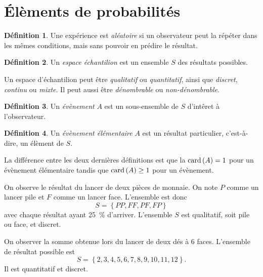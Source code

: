 \documentclass[11pt]{article}
\makeatletter
\newcommand\card{%
	\ensuremath{%
		\mathrm{card}\,%
	}%
}%
\theoremstyle{remark}
\theoremstyle{definition}
\newtheorem*{@definition}{Définition}
\newenvironment{definition}{%
	\begin{@definition}%
}{%
	\end{@definition}%
	\setcounter{property}{0}%
}
\makeatother
\begin{document}
\tableofcontents
\pagebreak

\section{Élèments de probabilités}
\begin{definition}
	Une expérience est \textit{aléatoire} si un observateur peut la répéter
	dans les mêmes conditions, mais sans pouvoir en prédire le résultat.
\end{definition}

\begin{definition}
	Un \textit{espace échantilion} est un ensemble $S$ des résultats possibles.
\end{definition}

Un espace d'échantilion peut être \textit{qualitatif} ou \textit{quantitatif},
ainsi que \textit{discret}, \textit{continu} ou \textit{mixte}. Il peut aussi
être \textit{dénombrable} ou \textit{non-dénombrable}.

\begin{definition}
	Un \textit{évènement} $A$ est un sous-ensemble de $S$ d'intêret à
	l'observateur.
\end{definition}

\begin{definition}
	Un \textit{évènement élémentaire} $A$ est un résultat particulier,
	c'est-à-dire, un élèment de $S$.
\end{definition}

La différence entre les deux dernières définitions est que la $\card(A)=1$ pour
un évènement élémentaire tandis que $\card(A)\geq 1$ pour un évènement.

\begin{exemple}
	On observe le résultat du lancer de deux pièces de monnaie. On note $P$
	comme un lancer pile et $F$ comme un lancer face. L'ensemble est donc
	\begin{equation*}
		S=\left\{PP, FF, PF, FP\right\}
	\end{equation*}
	avec chaque résultat ayant \SI{25}{\percent} d'arriver. L'ensemble $S$ est
	qualitatif, soit pile ou face, et discret.
\end{exemple}

\begin{exemple}
	On observer la somme obtenue lors du lancer de deux dés à 6 faces.
	L'ensemble de résultat possible est
	\begin{equation*}
		S=\left\{2,3,4,5,6,7,8,9,10,11,12\right\}.
	\end{equation*}
	Il est quantitatif et discret.
\end{exemple}
\end{document}
